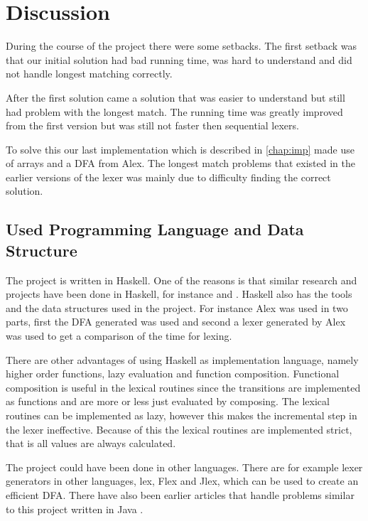\chapter{Discussion \label{chap:disc}}
During the course of the project there were some setbacks. The first setback
was that our initial solution had bad running time, was hard to understand and
did not handle longest matching correctly.

After the first solution came a solution
that was easier to understand but still had problem with the longest match. The
running time was greatly improved from the first version but was still not
faster then sequential lexers.

To solve this our last implementation which is
described in \cref{chap:imp} made use of arrays and a DFA from
Alex. The longest match problems that existed in the earlier versions of the
lexer was mainly due to difficulty finding the correct solution.

\section{Used Programming Language and Data Structure}
The project is written in Haskell. One of the reasons is that similar
research and projects have been done in Haskell, for instance \cite{blog} and \cite{fingertree}.
Haskell also has the tools and the data structures used in the project. For
instance Alex was used in two parts, first the DFA generated was used and second
a lexer generated by Alex was used to get a comparison of the time for lexing.

There are other advantages of using Haskell as implementation language, namely
higher order functions, lazy evaluation and function composition. Functional
composition is useful in the lexical routines since the transitions are
implemented as functions and are more or less just evaluated by composing.
The lexical routines can be implemented as lazy, however this makes the
incremental step in the lexer ineffective. Because of this the lexical routines
are implemented strict, that is all values are always calculated.

The project could have been done in other languages. There are for example
lexer generators in other languages, lex, Flex and Jlex, which can be used to
create an efficient DFA. There have also been earlier articles that handle
problems similar to this project written in Java \cite{JavaIncRegExp}.

